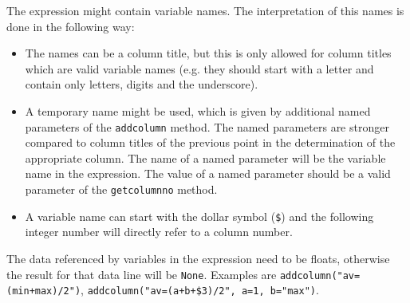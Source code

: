 The expression might contain variable names. The interpretation of
this names is done in the following way:
\begin{itemize}
\item The names can be a column title, but this is only allowed for
column titles which are valid variable names (e.g. they should start
with a letter and contain only letters, digits and the underscore).
\item A temporary name might be used, which is given by additional
named parameters of the \verb|addcolumn| method. The named parameters
are stronger compared to column titles of the previous point in the
determination of the appropriate column. The name of a named parameter
will be the variable name in the expression. The value of a named
parameter should be a valid parameter of the \verb|getcolumnno|
method.
\item A variable name can start with the dollar symbol (\verb|$|) and
the following integer number will directly refer to a column number.
\end{itemize}
The data referenced by variables in the expression need to be
floats, otherwise the result for that data line will be \verb|None|.
Examples are \verb|addcolumn("av=(min+max)/2")|,
\verb|addcolumn("av=(a+b+$3)/2", a=1, b="max")|.

